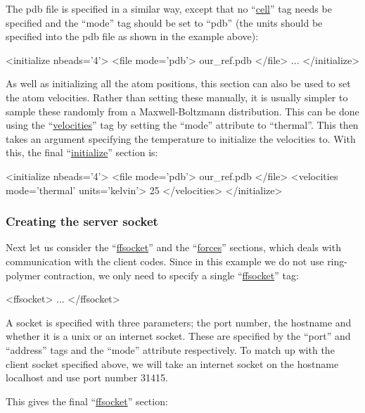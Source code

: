 \documentclass[11pt,english,fleqn]{report}
\newenvironment{code}{%
\footnotesize 
\verbatim
}{
\endverbatim
\normalsize
}
\begin{document}
The pdb file is specified in a similar way, except that no 
{}``\hyperref[INITCELL]{cell}''
tag needs be specified and the {}``mode'' tag should be
set to {}``pdb'' (the units should be specified into the pdb file as
shown in the example above):

\begin{code}
<initialize nbeads='4'>
   <file mode='pdb'> our_ref.pdb </file>
   ...
</initialize>
\end{code}

As well as initializing all the atom positions, this section
can also be used to set the atom velocities. Rather than setting these manually,
it is usually simpler to sample these randomly from a Maxwell-Boltzmann
distribution. This can be done using the 
{}``\hyperref[INITVELOCITIES]{velocities}'' 
tag by setting the {}``mode'' attribute to {}``thermal''.
This then takes an argument specifying the temperature to initialize the
velocities to. With this, the final 
{}``\hyperref[INITIALIZER]{initialize}'' section is:

\begin{code}
<initialize nbeads='4'>
   <file mode='pdb'> our_ref.pdb </file>
   <velocities mode='thermal' units='kelvin'> 25 </velocities>
</initialize>
\end{code}

\subsubsection{Creating the server socket}

Next let us consider the {}``\hyperref[FFSOCKET]{ffsocket}'' and the 
{}``\hyperref[FORCES]{forces}'' sections, which deals with communication
with the client codes. Since in this example we do not use ring-polymer contraction,
we only need to specify a single {}``\hyperref[FFSOCKET]{ffsocket}'' tag:

\begin{code}
<ffsocket>
   ...
</ffsocket>
\end{code}

A socket is specified with three parameters; the port number, the
hostname and whether it is a unix or an internet socket. 
These are specified by the {}``port'' and {}``address'' tags
and the {}``mode'' attribute respectively.
To match up with the client socket specified above,
we will take an internet socket on the hostname localhost and
use port number 31415. 

This gives the final {}``\hyperref[FFSOCKET]{ffsocket}'' section:
\end{document}
